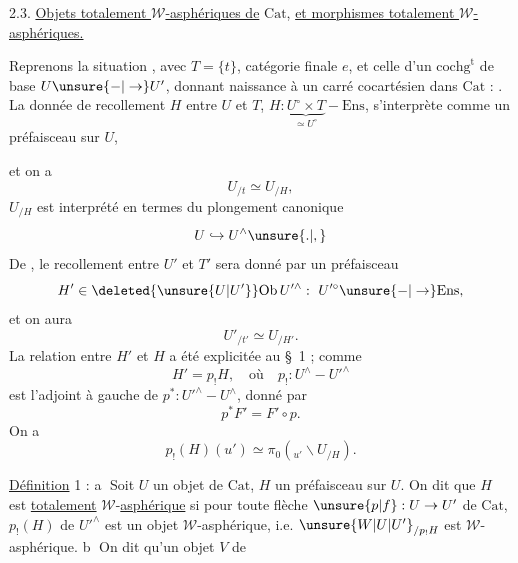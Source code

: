 2.3. \uline{Objets totalement $\mathcal W$-asphériques de} $\mathrm{Cat}$, \uline{et
morphismes totalement $\mathcal W$-asphériques.}

Reprenons la situation
, avec $T=\{t\}$, catégorie
finale  $e$,
et celle d'un $\mathrm{cochg}^{\mathrm t}$ de base $U\unsure{-|\to}U'$,
donnant naissance à un carré cocartésien dans $\mathrm{Cat}$ :
.
  La donnée de recollement $H$
entre $U$ et $T$, $H:\underbrace{U^{\circ}\times T}_{\simeq U^\circ}-\mathrm{Ens}$, 
s'interprète comme un préfaisceau sur $U$,


et on a
\[
 U_{/t}\simeq U_{/H},
\]
 $U_{/H}$ est interprété en termes du plongement
canonique
\[
 U\hookrightarrow U^\wedge\unsure{.|,}
\]
De , le recollement entre $U'$ et $T'$ sera donné par un préfaisceau
\[
 H'\in\deleted{\unsure{U|U'}}\mathrm{Ob}\,U'^\wedge:\ U'^\circ\unsure{-|\to}\mathrm{Ens},
\]
et on aura
\[
 U'_{/t'}\simeq U_{/H'}.
\]
La relation entre $H'$ et $H$ a été explicitée
au \S~1 ; comme
\[
 H'=p_!H,\quad\text{où}\quad p_!:U^\wedge-U'^\wedge
\]
est l'adjoint à gauche de $p^*:U'^\wedge-U^\wedge$,
donné par
\[
 p^*F'=F'\circ p.
\]
On a
\[
 p_!(H)(u')\simeq\pi_0({}_{u'}\backslash U_{/H}).
\]

\uline{Définition} 1 : \textcircled{a} Soit $U$ un objet de $\mathrm{Cat}$,
$H$  un préfaisceau sur $U$. On dit que  $H$
est \uline{totalement} $\mathcal W$-\uline{asphérique} si pour toute
flèche $\unsure{p|f}:U\to U'$ de $\mathrm{Cat}$, $p_!(H)$ de $U'^\wedge$
est un objet $\mathcal W$-asphérique, i.e. $\unsure{W|U|U'}_{/p_!H}$ est
$\mathcal W$-asphérique. \textcircled{b} On dit qu'un objet $V$ de

